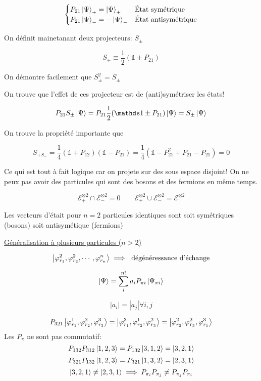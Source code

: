 $$\begin{cases}
	P_{21} \ket{\Psi}_+ = \ket{\Psi}_+ & \text{État symétrique}\\ 	
	P_{21} \ket{\Psi}_- = -\ket{\Psi}_- & \text{État antisymétrique}
\end{cases}$$ 


On définit mainetanant deux projecteurs: $S_{\pm} $ 

$$S_{\pm} \equiv \frac{1}{2} (\mathds 1 \pm P_{21} )$$ 

On démontre facilement que $S_{\pm}^2 = S_{\pm} $ 

On trouve que l'effet de ces projecteur est de (anti)symétriser les états!

$$P_{21} S_\pm\ket{\Psi} = P_{21} \frac{1}{2} (\mathds 1 \pm P_{21} ) \ket{\Psi} = S_{\pm} \ket{\Psi}$$ 


On trouve la propriété importante que 

$$S_{+S_-} = \frac{1}{4} \left( \mathds 1 + P_{12}  \right) \left( \mathds 1 - P_{21}  \right) = \frac{1}{4} \left( \mathds 1 -P_{21}^2 +P_{21} -P_21\right) =0 $$ 

Ce qui est tout à fait logique car on projete sur des sous espace disjoint! On ne peux pas avoir des particules qui sont des bosons et des fermions en même temps.

$$\mathcal{E}_+^{\otimes2} \cap \mathcal{E}_-^{\otimes2} = 0 \qquad \mathcal{E}_+^{\otimes2} \cup  \mathcal{E}_-^{\otimes2} = \mathcal{E}^{\otimes 2}$$ 


\begin{tcolorbox}[title = Septième postulat de la mécanique quantique; postulat de symétrisation]
Les vecteurs d'était pour $n=2 $ particules identiques sont soit symétriques (bosons) soit antisymétique (fermions) 
\end{tcolorbox}

\underline{Généralisation à plusieurs particules ($n > 2$) } 

$$\ket{\varphi_{r_1}^2,\varphi_{r_2}^2, \dotsb, \varphi_{r_n}^n} \implies \text{ dégénéressance d'échange}$$ 

$$\ket{\Psi} = \sum_{i}^{n!} a_{i} P_{\pi i} \ket{\Psi_{\pi i} }$$ 


$$|a_i| = |a_{j} | \forall i,j$$ 


\begin{tcolorbox}[title=Illustation avec $n\equiv3$ ]	
	$$P_{321} \ket{\varphi_{r_1}^1,\varphi_{r_2}^2,\varphi_{r_3}^3}= \ket{\varphi_{r_1}^3,\varphi_{r_2}^1,\varphi_{r_3}^2} = \ket{\varphi_{r_2}^2,\varphi_{r_3}^2, \varphi_{r_1}^3}$$ 
	Les $P_{\pi}$ ne sont pas commutatif:
	$$P_{132} P_{312} \ket{1,2,3} = P_{132} \ket{3,1,2} = \ket{3,2,1}$$ 
	$$P_{321} P_{132} \ket{1,2,3} = P_{321} \ket{1,3,2} = \ket{2,3,1}$$ 
	$$\ket{3,2,1} \neq \ket{2,3,1} \implies P_{\pi_i} P_{\pi_j} \neq P_{\pi_j} P_{\pi_i} $$ 
\end{tcolorbox}



